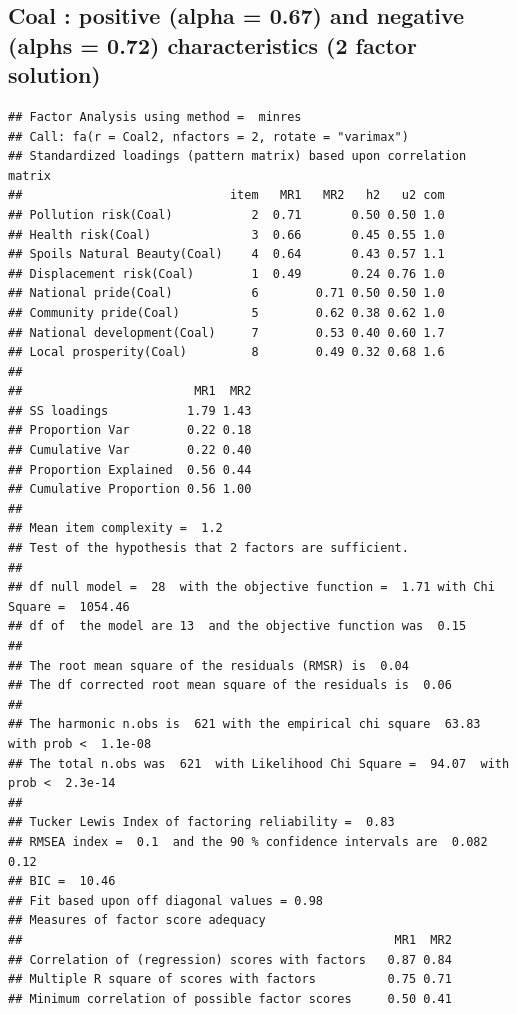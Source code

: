 \documentclass[
]{article}
\begin{document}
\newpage
\begin{landscape}

\hypertarget{coal-positive-alpha-0.67-and-negative-alphs-0.72-characteristics-2-factor-solution}{%
\subsection{Coal : positive (alpha = 0.67) and negative (alphs = 0.72)
characteristics (2 factor
solution)}\label{coal-positive-alpha-0.67-and-negative-alphs-0.72-characteristics-2-factor-solution}}

\begin{verbatim}
## Factor Analysis using method =  minres
## Call: fa(r = Coal2, nfactors = 2, rotate = "varimax")
## Standardized loadings (pattern matrix) based upon correlation matrix
##                             item   MR1   MR2   h2   u2 com
## Pollution risk(Coal)           2  0.71       0.50 0.50 1.0
## Health risk(Coal)              3  0.66       0.45 0.55 1.0
## Spoils Natural Beauty(Coal)    4  0.64       0.43 0.57 1.1
## Displacement risk(Coal)        1  0.49       0.24 0.76 1.0
## National pride(Coal)           6        0.71 0.50 0.50 1.0
## Community pride(Coal)          5        0.62 0.38 0.62 1.0
## National development(Coal)     7        0.53 0.40 0.60 1.7
## Local prosperity(Coal)         8        0.49 0.32 0.68 1.6
## 
##                        MR1  MR2
## SS loadings           1.79 1.43
## Proportion Var        0.22 0.18
## Cumulative Var        0.22 0.40
## Proportion Explained  0.56 0.44
## Cumulative Proportion 0.56 1.00
## 
## Mean item complexity =  1.2
## Test of the hypothesis that 2 factors are sufficient.
## 
## df null model =  28  with the objective function =  1.71 with Chi Square =  1054.46
## df of  the model are 13  and the objective function was  0.15 
## 
## The root mean square of the residuals (RMSR) is  0.04 
## The df corrected root mean square of the residuals is  0.06 
## 
## The harmonic n.obs is  621 with the empirical chi square  63.83  with prob <  1.1e-08 
## The total n.obs was  621  with Likelihood Chi Square =  94.07  with prob <  2.3e-14 
## 
## Tucker Lewis Index of factoring reliability =  0.83
## RMSEA index =  0.1  and the 90 % confidence intervals are  0.082 0.12
## BIC =  10.46
## Fit based upon off diagonal values = 0.98
## Measures of factor score adequacy             
##                                                    MR1  MR2
## Correlation of (regression) scores with factors   0.87 0.84
## Multiple R square of scores with factors          0.75 0.71
## Minimum correlation of possible factor scores     0.50 0.41
\end{verbatim}


\end{landscape}
\end{document}
